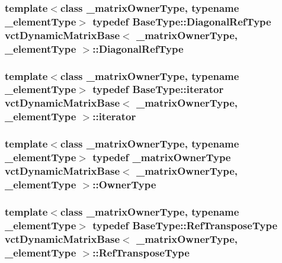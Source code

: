 \subsubsection[{Diagonal\+Ref\+Type}]{\setlength{\rightskip}{0pt plus 5cm}template$<$class \+\_\+matrix\+Owner\+Type, typename \+\_\+element\+Type$>$ typedef {\bf Base\+Type\+::\+Diagonal\+Ref\+Type} {\bf vct\+Dynamic\+Matrix\+Base}$<$ \+\_\+matrix\+Owner\+Type, \+\_\+element\+Type $>$\+::{\bf Diagonal\+Ref\+Type}}\label{classvct_dynamic_matrix_base_a594a79de6406a638f5e725daa76294a6}
\hypertarget{classvct_dynamic_matrix_base_a60f380ccdba201f2cec57ec3905b8229}{}
\subsubsection[{iterator}]{\setlength{\rightskip}{0pt plus 5cm}template$<$class \+\_\+matrix\+Owner\+Type, typename \+\_\+element\+Type$>$ typedef {\bf Base\+Type\+::iterator} {\bf vct\+Dynamic\+Matrix\+Base}$<$ \+\_\+matrix\+Owner\+Type, \+\_\+element\+Type $>$\+::{\bf iterator}}\label{classvct_dynamic_matrix_base_a60f380ccdba201f2cec57ec3905b8229}
\hypertarget{classvct_dynamic_matrix_base_a224b1f3a25e201d7b45be1da3ac69951}{}
\subsubsection[{Owner\+Type}]{\setlength{\rightskip}{0pt plus 5cm}template$<$class \+\_\+matrix\+Owner\+Type, typename \+\_\+element\+Type$>$ typedef \+\_\+matrix\+Owner\+Type {\bf vct\+Dynamic\+Matrix\+Base}$<$ \+\_\+matrix\+Owner\+Type, \+\_\+element\+Type $>$\+::{\bf Owner\+Type}}\label{classvct_dynamic_matrix_base_a224b1f3a25e201d7b45be1da3ac69951}
\hypertarget{classvct_dynamic_matrix_base_a21a1c69f7e029b28a2884718ac9c297b}{}
\subsubsection[{Ref\+Transpose\+Type}]{\setlength{\rightskip}{0pt plus 5cm}template$<$class \+\_\+matrix\+Owner\+Type, typename \+\_\+element\+Type$>$ typedef {\bf Base\+Type\+::\+Ref\+Transpose\+Type} {\bf vct\+Dynamic\+Matrix\+Base}$<$ \+\_\+matrix\+Owner\+Type, \+\_\+element\+Type $>$\+::{\bf Ref\+Transpose\+Type}}\label{classvct_dynamic_matrix_base_a21a1c69f7e029b28a2884718ac9c297b}
\hypertarget{classvct_dynamic_matrix_base_a5390b4a252fc2e2bbe94cbd19f8c9fa2}{}
